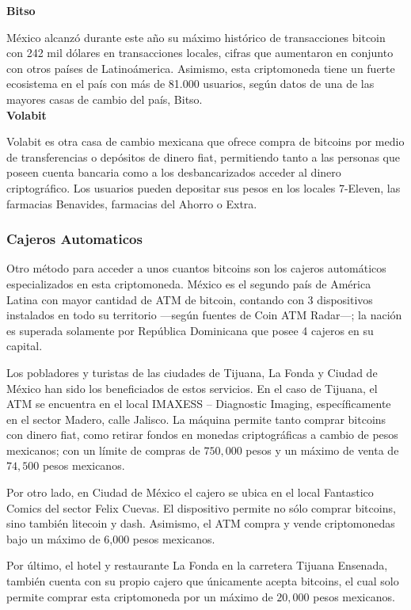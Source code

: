 \documentclass[12pt,letterpaper]{article}
\begin{document}
\textbf{Bitso}

M\'exico alcanz\'o durante este año su m\'aximo hist\'orico de transacciones bitcoin con 242 mil d\'olares en transacciones locales, cifras que aumentaron en conjunto con otros pa\'ises de Latino\'america. Asimismo, esta criptomoneda tiene un fuerte ecosistema en el pa\'is con m\'as de 81.000 usuarios, seg\'un datos de una de las mayores casas de cambio del pa\'is, Bitso.
\\

\textbf{Volabit}

Volabit es otra casa de cambio mexicana que ofrece compra de bitcoins por medio de transferencias o dep\'ositos de dinero fiat, permitiendo tanto a las personas que poseen cuenta bancaria como a los desbancarizados acceder al dinero criptogr\'afico. Los usuarios pueden depositar sus pesos en los locales 7-Eleven, las farmacias Benavides, farmacias del Ahorro o Extra.
\\

\subsubsection*{Cajeros Automaticos}

Otro m\'etodo para acceder a unos cuantos bitcoins son los cajeros autom\'aticos especializados en esta criptomoneda. M\'exico es el segundo pa\'is de Am\'erica Latina con mayor cantidad de ATM de bitcoin, contando con 3 dispositivos instalados en todo su territorio —seg\'un fuentes de Coin ATM Radar—; la naci\'on es superada solamente por Rep\'ublica Dominicana que posee 4 cajeros en su capital.

Los pobladores y turistas de las ciudades de Tijuana, La Fonda y Ciudad de M\'exico han sido los beneficiados de estos servicios. En el caso de Tijuana, el ATM se encuentra en el local IMAXESS – Diagnostic Imaging, espec\'ificamente en el sector Madero, calle Jalisco. La m\'aquina permite tanto comprar bitcoins con dinero fiat, como retirar fondos en monedas criptogr\'aficas a cambio de pesos mexicanos; con un l\'imite de compras de $750,000$ pesos y un m\'aximo de venta de $74,500$ pesos mexicanos.

Por otro lado, en Ciudad de M\'exico el cajero se ubica en el local Fantastico Comics del sector Felix Cuevas. El dispositivo permite no s\'olo comprar bitcoins, sino tambi\'en litecoin y dash. Asimismo, el ATM compra y vende criptomonedas bajo un m\'aximo de 6,000 pesos mexicanos.

Por \'ultimo, el hotel y restaurante La Fonda en la carretera Tijuana Ensenada, tambi\'en cuenta con su propio cajero que \'unicamente acepta bitcoins, el cual solo permite comprar esta criptomoneda por un m\'aximo de $20,000$ pesos mexicanos.
\end{document}
